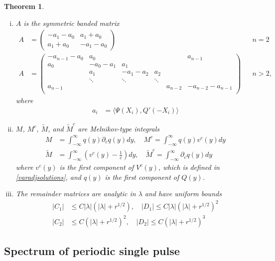 \documentclass[10pt,reqno]{amsart}
\theoremstyle{plain}
\newtheorem{theorem}{Theorem}
\theoremstyle{definition}
\theoremstyle{remark}
\numberwithin{theorem}{section}
\numberwithin{equation}{section}
\begin{document}
\begin{theorem}
\begin{enumerate}[(i)]
\item $A$ is the symmetric banded matrix
\begin{align}\label{Asymm}
A &= \begin{pmatrix}
-a_1 - a_0 & a_1 + a_0 \\
a_1 + a_0 & - a_1 - a_0 
\end{pmatrix} && n = 2 \\
A &= \begin{pmatrix}
-a_{n-1} - a_0 & a_0 & & &  & a_{n-1}\\
a_0 & -a_0 - a_1 &  a_1 \\
& a_1 & -a_1 - a_2 &  a_2 \\
& \ddots & \ddots & \ddots \\
a_{n-1} & & & & a_{n-2} & -a_{n-2} - a_{n-1} \\
\end{pmatrix} && n > 2,
\end{align}
where
\begin{align*}
a_i &= \langle \Psi(X_i), Q'(-X_i) \rangle
\end{align*}

\item $M$, $M^c$, $\tilde{M}$, and $\tilde{M}^c$ are  Melnikov-type integrals
\begin{align*}
M &= \int_{-\infty}^\infty q(y) \partial_c q(y) dy, \quad
M^c = \int_{-\infty}^\infty q(y) v^c(y) dy \\
\tilde{M} &= \int_{-\infty}^{\infty} \left(v^c(y) - \frac{1}{c}\right) dy, \quad
\tilde{M}^c = \int_{-\infty}^\infty \partial_c q(y) dy
\end{align*}
where $v^c(y)$ is the first component of $V^c(y)$, which is defined in \cref{varadjsolutions}, and $q(y)$ is the first component of $Q(y)$.

\item The remainder matrices are analytic in $\lambda$ and have uniform bounds
\begin{align*}
|C_1| &\leq C |\lambda|(|\lambda| + r^{1/2}), \quad
|D_1| \leq C |\lambda|(|\lambda| + r^{1/2})^2 \\
|C_2| &\leq C (|\lambda| + r^{1/2})^2, \quad
|D_2| \leq C (|\lambda| + r^{1/2})^3 
\end{align*}
\end{enumerate}
\end{theorem}

\subsection{Spectrum of periodic single pulse}\label{sec:persingle}
\end{document}
